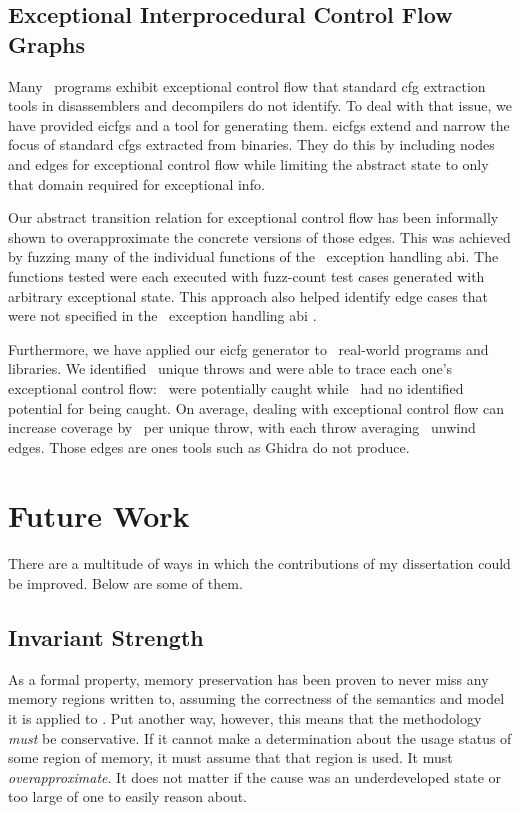 \subsection{Exceptional Interprocedural Control Flow Graphs}
Many \Cpp\ programs exhibit exceptional control flow that standard \ac{cfg} extraction tools in disassemblers and decompilers do not identify.
To deal with that issue, we have provided \acp{eicfg} and a tool for generating them.
\acp{eicfg} extend and narrow the focus of standard \acp{cfg} extracted from binaries.
They do this by including nodes and edges for exceptional control flow while limiting the abstract state to only that domain required for exceptional info.

Our abstract transition relation for exceptional control flow has been informally shown to overapproximate the concrete versions of those edges.
This was achieved by fuzzing many of the individual functions of the \Cpp\ exception handling \ac{abi}.
The functions tested were each executed with \gls{fuzz-count} test cases generated with arbitrary exceptional state.
This approach also helped identify edge cases that were not specified in the \Cpp\ exception handling \ac{abi} \cite{cxxEhAbi}.

Furthermore, we have applied our \ac{eicfg} generator to \totalbins\ real-world programs and libraries.
We identified \uniquethrows\ unique throws and were able to trace each one's exceptional control flow: \caughtthrows\ were potentially caught while \uncaughtthrows\ had no identified potential for being caught.
On average, dealing with exceptional control flow can increase coverage by \avgdiffinst\ per unique throw, with each throw averaging \avgunwinds\ unwind edges.
Those edges are ones tools such as Ghidra do not produce.

\section{Future Work}
There are a multitude of ways in which the contributions of my dissertation could be improved.
Below are some of them.

\subsection{Invariant Strength}
As a formal property, memory preservation has been proven to never miss any memory regions written to, assuming the correctness of the semantics and model it is applied to \autocite{bockenek2019preservation,verbeek2022lifting}.
Put another way, however, this means that the methodology \emph{must} be conservative.
If it cannot make a determination about the usage status of some region of memory,
it must assume that that region is used. It must \emph{overapproximate}.%
It does not matter if the cause was an underdeveloped state or too large of one to easily reason about.

